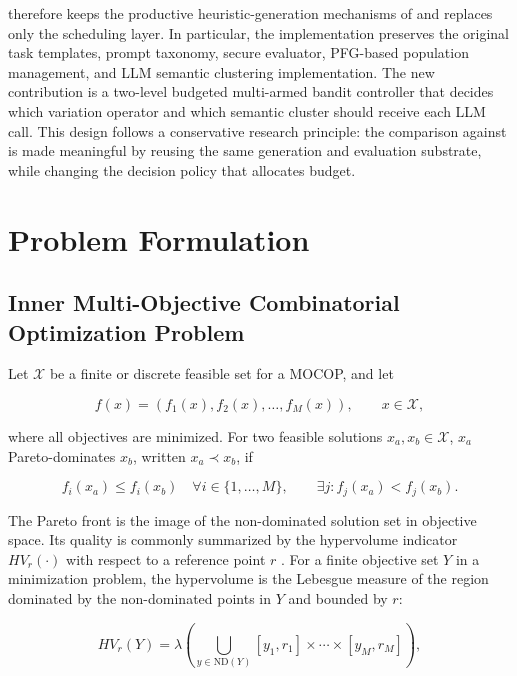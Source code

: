 \bmab{} therefore keeps the productive heuristic-generation mechanisms of \mpage{} and replaces only the scheduling layer. In particular, the implementation preserves the original task templates, prompt taxonomy, secure evaluator, PFG-based population management, and LLM semantic clustering implementation. The new contribution is a two-level budgeted multi-armed bandit controller that decides which variation operator and which semantic cluster should receive each LLM call. This design follows a conservative research principle: the comparison against \mpage{} is made meaningful by reusing the same generation and evaluation substrate, while changing the decision policy that allocates budget.

\section{Problem Formulation}

\subsection{Inner Multi-Objective Combinatorial Optimization Problem}

Let $\mathcal{X}$ be a finite or discrete feasible set for a MOCOP, and let

\begin{equation}
  f(x) = \left(f_1(x), f_2(x), \ldots, f_M(x)\right), \qquad x \in \mathcal{X},
\end{equation}

where all objectives are minimized. For two feasible solutions $x_a,x_b \in \mathcal{X}$, $x_a$ Pareto-dominates $x_b$, written $x_a \prec x_b$, if

\begin{equation}
  f_i(x_a) \le f_i(x_b) \quad \forall i \in \{1,\ldots,M\},
  \qquad
  \exists j: f_j(x_a) < f_j(x_b).
\end{equation}

The Pareto front is the image of the non-dominated solution set in objective space. Its quality is commonly summarized by the hypervolume indicator $HV_r(\cdot)$ with respect to a reference point $r$ \cite{zitzler1999multiobjective,fonseca2006hv}. For a finite objective set $Y$ in a minimization problem, the hypervolume is the Lebesgue measure of the region dominated by the non-dominated points in $Y$ and bounded by $r$:

\[
  HV_r(Y)
  =
  \lambda\!\left(
    \bigcup_{y \in \mathrm{ND}(Y)}
    [y_1,r_1]\times \cdots \times [y_M,r_M]
  \right),
\]

